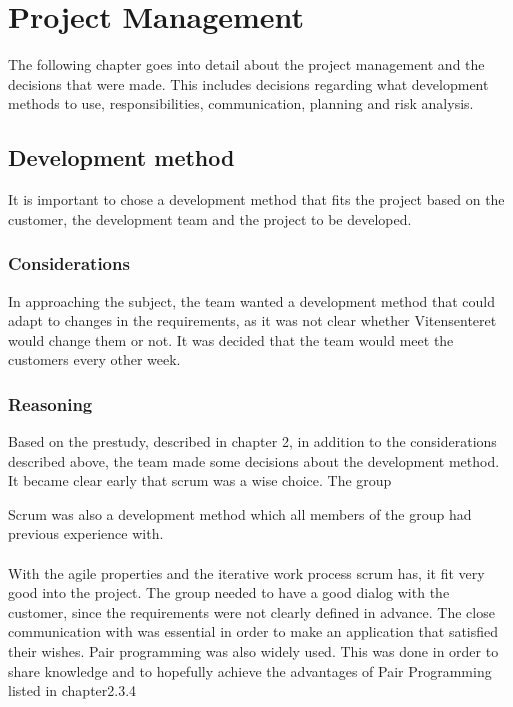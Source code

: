 \chapter{Project Management}
The following chapter goes into detail about the project management and the decisions that were made. This includes decisions regarding what development methods to use, responsibilities, communication, planning and risk analysis.

\section{Development method}
It is important to chose a development method that fits the project based on the customer, the development team and the project to be developed.

\subsection{Considerations}
In approaching the subject, the team wanted a development method that could adapt to changes in the requirements, as it was not clear whether Vitensenteret would change them or not. It was decided that the team would meet the customers every other week.

\subsection{Reasoning}
Based on the prestudy, described in chapter 2, in addition to the considerations described above, the team made some decisions about the development method. It became clear early that scrum was a wise choice. The group  

Scrum was also a development method which all members of the group had previous experience with.\\
\\
With the agile properties and the iterative work process scrum has, it fit very good into the project. The group needed to have a good dialog with the customer, since the requirements were not clearly defined in advance. The close communication with was essential in order to make an application that satisfied their wishes. Pair programming was also widely used. This was done in order to share knowledge and to hopefully achieve the advantages of Pair Programming listed in chapter2.3.4 


